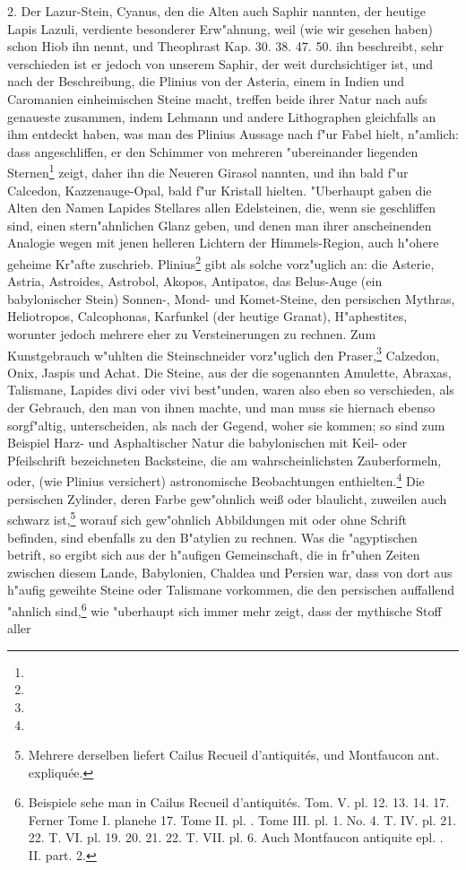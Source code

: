 \documentclass[a4paper, 11pt, oneside, polutonikogreek, german]{article}
\begin{document}
2. Der Lazur-Stein, Cyanus, den die Alten auch Saphir nannten, der heutige Lapis Lazuli, verdiente besonderer Erw"ahnung, weil (wie wir gesehen haben) schon Hiob ihn nennt, und Theophrast Kap. 30. 38. 47. 50. ihn beschreibt, sehr verschieden ist er jedoch von unserem Saphir, der weit durchsichtiger ist, und nach der Beschreibung, die Plinius von der Asteria, einem in Indien und Caromanien einheimischen Steine macht, treffen beide ihrer Natur nach aufs genaueste zusammen, indem Lehmann und andere Lithographen gleichfalls an ihm entdeckt haben, was man des Plinius Aussage nach f"ur Fabel hielt, n"amlich: dass angeschliffen, er den Schimmer von mehreren "ubereinander liegenden Sternen\footnote{} zeigt, daher ihn die Neueren Girasol nannten, und ihn bald f"ur Calcedon, Kazzenauge-Opal, bald f"ur Kristall hielten. "Uberhaupt gaben die Alten den Namen Lapides Stellares allen Edelsteinen, die, wenn sie geschliffen sind, einen stern"ahnlichen Glanz geben, und denen man ihrer anscheinenden Analogie wegen mit jenen helleren Lichtern der Himmels-Region, auch h"ohere geheime Kr"afte zuschrieb. Plinius\footnote{} gibt als solche vorz"uglich an: die Asterie, Astria, Astroides, Astrobol, Akopos, Antipatos, das Belus-Auge (ein babylonischer Stein) Sonnen-, Mond- und Komet-Steine, den persischen Mythras, Heliotropos, Calcophonas, Karfunkel (der heutige Granat), H"aphestites, worunter jedoch mehrere eher zu Versteinerungen zu rechnen. Zum Kunstgebrauch w"uhlten die Steinschneider vorz"uglich den Praser,\footnote{} Calzedon, Onix, Jaspis und Achat. Die Steine, aus der die sogenannten Amulette, Abraxas, Talismane, Lapides divi oder vivi best"unden, waren also eben so verschieden, als der Gebrauch, den man von ihnen machte, und man muss sie hiernach ebenso sorgf"altig, unterscheiden, als nach der Gegend, woher sie kommen; so sind zum Beispiel Harz- und Asphaltischer Natur die babylonischen mit Keil- oder Pfeilschrift bezeichneten Backsteine, die am wahrscheinlichsten Zauberformeln, oder, (wie Plinius versichert) astronomische Beobachtungen enthielten.\footnote{} Die persischen Zylinder, deren Farbe gew"ohnlich weiß oder blaulicht, zuweilen auch schwarz ist,\footnote{Mehrere derselben liefert Cailus Recueil d'antiquités, und Montfaucon ant. expliquée.} worauf sich gew"ohnlich Abbildungen mit oder ohne Schrift befinden, sind ebenfalls zu den B"atylien zu rechnen. Was die "agyptischen betrift, so ergibt sich aus der h"aufigen Gemeinschaft, die in fr"uhen Zeiten zwischen diesem Lande, Babylonien, Chaldea und Persien war, dass von dort aus h"aufig geweihte Steine oder Talismane vorkommen, die den persischen auffallend "ahnlich sind,\footnote{Beispiele sehe man in Cailus Recueil d'antiquités. Tom. V. pl. 12. 13. 14. 17. Ferner Tome I. planehe 17. Tome II. pl. . Tome III. pl. 1. No. 4. T. IV. pl. 21. 22. T. VI. pl. 19. 20. 21. 22. T. VII. pl. 6. Auch Montfaucon antiquite epl. . II. part. 2.} wie "uberhaupt sich immer mehr zeigt, dass der mythische Stoff aller 
\end{document}
